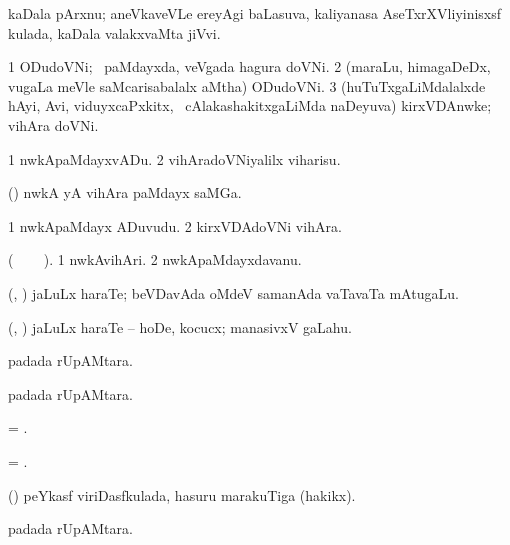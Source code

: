   kaDala pArxnu; aneVkaveVLe ereyAgi baLasuva, kaliyanasa AseTxrXVliyinisxsf kulada, kaDala valakxvaMta jiVvi.
\eanum
\emng
\eentry

\bentry
{} 
\gl{\nA} 
\bmng
\bnum
\num{1} ODudoVNi; \kanmu\ paMdayxda, veVgada hagura  doVNi. 
\num{2} (maraLu, himagaDeDx, \mo vugaLa meVle saMcarisabalalx aMtha) ODudoVNi. 
\num{3} (huTuTxgaLiMdalalxde hAyi, Avi, viduyxcaPxkitx, \mo\ cAlakashakitxgaLiMda naDeyuva) kirxVDAnwke; vihAra doVNi.
\enum
\emng
\eentry

\bentry
{} 
\gl{\akirx} 
\bmng
\bnum
\num{1} nwkApaMdayxvADu. 
\num{2}  vihAradoVNiyalilx viharisu.
\enum
\emng
\eentry

\bentry 
{} 
\gl{\nA}
\bmng
(\kanmu) nwkA yA vihAra paMdayx saMGa.
\emng
\eentry

\bentry
{} 
\gl{\nA} 
\bmng
\bnum
\num{1} nwkApaMdayx ADuvudu. 
\num{2} kirxVDAdoVNi vihAra.
\enum
\emng
\eentry

\bentry
{} 
\gl{\nA} 
\bmng
(\bava\   \sitxrXV\   \bava\ ).
\bnum
\num{1} nwkAvihAri. 
\num{2} nwkApaMdayxdavanu.
\enum
\emng
\eentry

\bentry
{} 
\gl{\nA}  
\bmng
(\ashi, \hiV) jaLuLx haraTe; beVDavAda oMdeV samanAda vaTavaTa mAtugaLu.
\emng
\eentry

\bentry
{} 
\gl{\akirx} 
\bmng
(\ashi, \hiV) jaLuLx haraTe -- hoDe, kocucx; manasivxV gaLahu.
\emng
\eentry

\bentry
{} 
\gl{\nA}
\bmng
{} padada rUpAMtara.
\emng
\eentry

\bentry
{} 
\gl{\nA} 
\bmng
{} padada rUpAMtara.
\emng
\eentry

\bentry
{} 
\gl{\nA}
\bmng
= .
\emng
\eentry

\bentry
{} 
\gl{\akirx} 
\bmng
= .
\emng
\eentry

\bentry
{} 
\gl{\nA}
\bmng
(\pArxM) peYkasf viriDasfkulada, hasuru marakuTiga (hakikx).
\emng
\eentry

\bentry
{} 
\gl{\nA}
\bmng
{} padada rUpAMtara. 
\emng
\eentry

